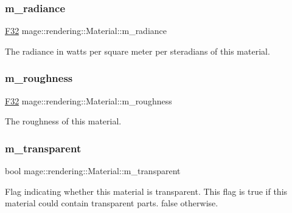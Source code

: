 \subsubsection{\texorpdfstring{m\+\_\+radiance}{m\_radiance}}
{\footnotesize\ttfamily \mbox{\hyperlink{namespacemage_aa97e833b45f06d60a0a9c4fc22ae02c0}{F32}} mage\+::rendering\+::\+Material\+::m\+\_\+radiance\hspace{0.3cm}{\ttfamily [private]}}

The radiance in watts per square meter per steradians of this material. \mbox{\label{classmage_1_1rendering_1_1_material_a14b420a0bdb8cb1f0fa57aa31bd09ae1}} 
\subsubsection{\texorpdfstring{m\+\_\+roughness}{m\_roughness}}
{\footnotesize\ttfamily \mbox{\hyperlink{namespacemage_aa97e833b45f06d60a0a9c4fc22ae02c0}{F32}} mage\+::rendering\+::\+Material\+::m\+\_\+roughness\hspace{0.3cm}{\ttfamily [private]}}

The roughness of this material. \mbox{\label{classmage_1_1rendering_1_1_material_af9f8d0fdb613bce1a4c3683836649bf3}} 
\subsubsection{\texorpdfstring{m\+\_\+transparent}{m\_transparent}}
{\footnotesize\ttfamily bool mage\+::rendering\+::\+Material\+::m\+\_\+transparent\hspace{0.3cm}{\ttfamily [private]}}

Flag indicating whether this material is transparent. This flag is {\ttfamily true} if this material could contain transparent parts. {\ttfamily false} otherwise. 